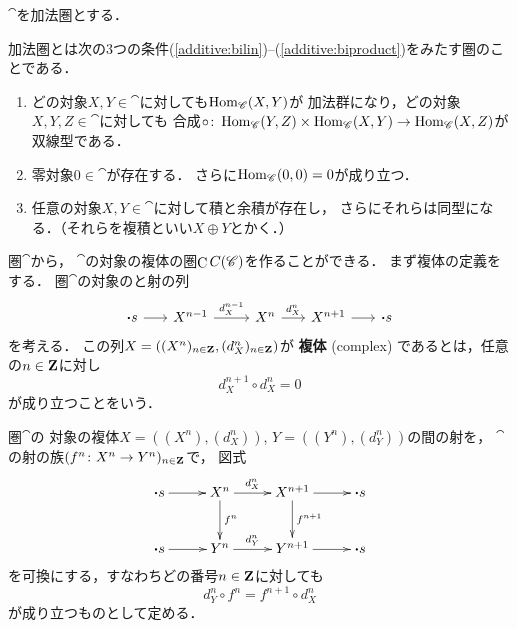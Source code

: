 $\cat$を加法圏とする．
\begin{Attention*}
    加法圏とは次の3つの条件(\ref{additive:bilin})--(\ref{additive:biproduct})をみたす圏のことである．
    \begin{enumerate}
        \renewcommand{\labelenumi}{({\arabic{enumi}})}
        \item どの対象$X, Y\in\cat$に対しても$\mathop{\mathrm{Hom}}\nolimits_{\mathscr{C}}(X,Y)$が
        加法群になり，どの対象$X, Y, Z\in\cat$に対しても
        合成$\circ\colon\mathop{\mathrm{Hom}}\nolimits_{\mathscr{C}}(Y,Z)\times\mathop{\mathrm{Hom}}\nolimits_{\mathscr{C}}(X,Y)
        \to\mathop{\mathrm{Hom}}\nolimits_{\mathscr{C}}(X,Z)$が双線型である．\label{additive:bilin}
        \item 零対象$0\in\cat$が存在する．
        さらに$\mathop{\mathrm{Hom}}\nolimits_{\mathscr{C}}(0,0)=0$が成り立つ．\label{additive:zero}
        \item 任意の対象$X, Y\in\cat$に対して積と余積が存在し，
        さらにそれらは同型になる．（それらを複積といい$X\oplus Y$とかく．）\label{additive:biproduct}
    \end{enumerate}
\end{Attention*}
圏$\cat$から，
$\cat$の対象の複体の圏$\mathop{\mathrm{C}}\nolimits{C}(\mathscr{C})$を作ることができる．
まず複体の定義をする．
圏$\cat$の対象のと射の列
\begin{equation}\label{eq:complex}
    \begin{tikzcd}[column sep=0.6cm]
        \boldsymbol{\cdot}s
        \arrow[r]
        &
        X^{n-1}
        \arrow[r,"d_X^{n-1}"] 
        &[+0.3cm]%
        X^n
        \arrow[r,"d_X^{n}"]
        &%
        X^{n+1}
        \arrow[r, ""] 
        &%
        \boldsymbol{\cdot}s
    \end{tikzcd}
\end{equation}
を考える．
この列$X=\left((X^n)_{n\in\mathbf{Z}},(d_X^{n})_{n\in\mathbf{Z}}\right)$が
\textbf{複体} (complex) であるとは，任意の$n\in\mathbf{Z}$に対し
\begin{equation}
    d_X^{n+1}\circ d_X^{n}=0
\end{equation}
が成り立つことをいう．

圏$\cat$の
対象の複体$X=((X^n),(d_X^{n}))$, $Y=((Y^n),(d_Y^{n}))$の間の射を，
$\cat$の射の族$(f^n\colon X^n\to Y^n)_{n\in\mathbf{Z}}$で，
図式
\begin{equation*}
    \vcenter{\xymatrix@C=26pt@R=26pt{
    \boldsymbol{\cdot}s \ar[r]
    & 
    X^{n}
    \ar[r]^-{d_X^n}
    \ar[d]^-{f^n}
    &
    X^{n+1}
    \ar[r]
    \ar[d]^-{f^{n+1}} 
    &\boldsymbol{\cdot}s
    \\
    \boldsymbol{\cdot}s \ar[r]
    & 
    Y^{n}
    \ar[r]^-{d_Y^n}
    &
    Y^{n+1}
    \ar[r]
    &\boldsymbol{\cdot}s
    }}
\end{equation*}
を可換にする，すなわちどの番号$n\in\mathbf{Z}$に対しても
\begin{equation}
    d_Y^n\circ f^n=f^{n+1}\circ d_X^n 
\end{equation}
が成り立つものとして定める．

